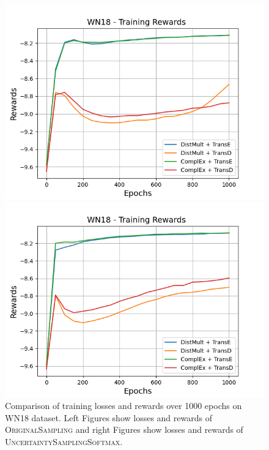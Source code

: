 \begin{figure}
\begin{minipage}{.5\textwidth}
      \includegraphics[width=0.9\linewidth]{figures/results/gan_train/not_pretrained/random/wn18/random_wn18_rew.png}
    \end{minipage}%
    \begin{minipage}{.5\textwidth}
      \centering
      \includegraphics[width=0.9\linewidth]{figures/results/gan_train/not_pretrained/uncertainty/max_distribution/entropy/wn18/uncertainty_wn18_rew.png}
    \end{minipage}%
    \caption{Comparison of training losses and rewards over 1000 epochs on \textsc{WN18} dataset.
    Left Figures show losses and rewards of \textsc{OriginalSampling} and right Figures show losses and rewards of \textsc{UncertaintySamplingSoftmax}.}
    \label{fig:advtrain_wn18_losses_rewards}
\end{figure}